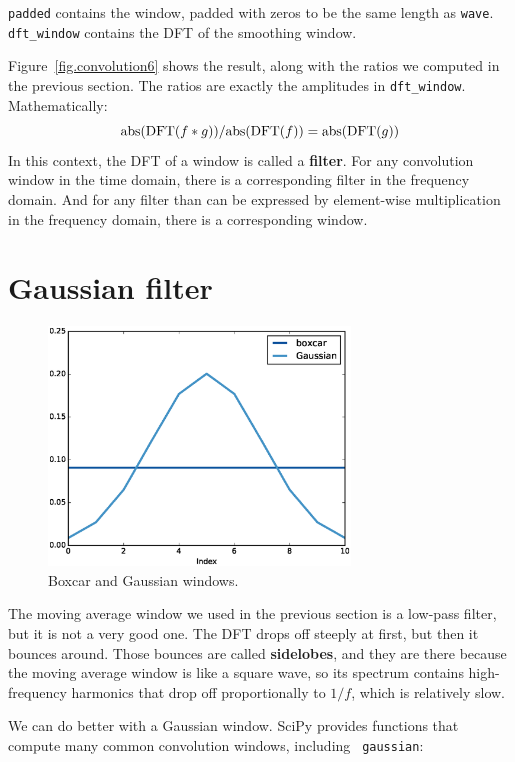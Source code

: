 \documentclass[12pt]{book}
\begin{document}
{\tt padded} contains the window, padded with zeros to be the
same length as {\tt wave}.  \verb"dft_window" contains the
DFT of the smoothing window.

\newcommand{\abs}{\mathrm{abs}}

Figure~\ref{fig.convolution6} shows the result, along with the
ratios we computed in the previous section.  The ratios are
exactly the amplitudes in \verb"dft_window".  Mathematically:
%
\[ \abs(\DFT(f \conv g)) / \abs(\DFT(f)) = \abs(\DFT(g)) \]
%
In this context, the DFT of a window is called a {\bf filter}.
For any convolution window in the time domain, there is a
corresponding filter in the frequency domain.  And for any
filter than can be expressed by element-wise multiplication in
the frequency domain, there is a corresponding window.


\section{Gaussian filter}

\begin{figure}
\centerline{\includegraphics[height=2.5in]{figs/convolution7.eps}}
\caption{Boxcar and Gaussian windows.}
\label{fig.convolution7}
\end{figure}

The moving average window we used in the previous section is a
low-pass filter, but it is not a very good one.  The DFT drops off
steeply at first, but then it bounces around.  Those bounces are
called {\bf sidelobes}, and they are there because the moving average
window is like a square wave, so its spectrum contains high-frequency
harmonics that drop off proportionally to $1/f$, which is relatively
slow.

We can do better with a Gaussian window.  SciPy provides functions
that compute many common convolution windows, including {\tt
  gaussian}:
\end{document}
